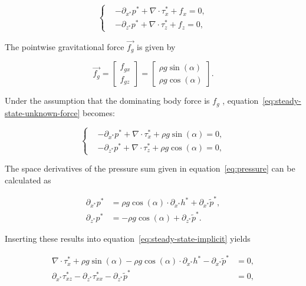 \begin{equation} \label{eq:steady-state-unknown-force}
  \begin{cases}
    &-\partial_{x^*} p^* + \nabla \cdot \tau_x^* + f_x = 0, \\
    &-\partial_{z^*} p^* + \nabla \cdot \tau_z^* + f_z = 0,
  \end{cases}
\end{equation}

The pointwise gravitational force $\vec{f_g}$ is given by

\begin{equation}
  \vec{f_g} = \begin{bmatrix} f_{gx} \\ f_{gz} \end{bmatrix} = \begin{bmatrix} \rho g \sin(\alpha) \\ \rho g \cos(\alpha) \end{bmatrix}.
\end{equation}

Under the assumption that the dominating body force is $f_g$ , equation~\eqref{eq:steady-state-unknown-force} becomes:

\begin{equation} \label{eq:steady-state-implicit}
  \begin{cases}
    &-\partial_{x^*} p^* + \nabla \cdot \tau_x^* + \rho g \sin(\alpha) = 0, \\
    &-\partial_{z^*} p^* + \nabla \cdot \tau_z^* + \rho g \cos(\alpha) = 0,
  \end{cases}
\end{equation}

The space derivatives of the pressure sum given in equation~\eqref{eq:pressure} can be calculated as

\begin{equation} \label{eq:pressure-space-derivative}
  \begin{split}
  \partial_{x^*} p^* &= \rho g \cos(\alpha) \cdot \partial_{x^*} h^* + \partial_{x^*} \tilde{p}^*, \\
  \partial_{z^*} p^* &= - \rho g \cos(\alpha) + \partial_{z^*} \tilde{p}^*.
  \end{split}
\end{equation}

Inserting these results into equation~\eqref{eq:steady-state-implicit} yields

\begin{equation} \label{eq:steady-state-explicit}
  \begin{split}
    \nabla \cdot \tau_x^* + \rho g \sin(\alpha) - \rho g \cos(\alpha) \cdot \partial_{x^*} h^* - \partial_{x^*} \tilde{p}^* &= 0, \\
    \partial_{x^*} \tau_{xz}^* - \partial_{z^*} \tau_{xx}^* - \partial_{z^*} \tilde{p}^* &= 0,
  \end{split}
\end{equation}
